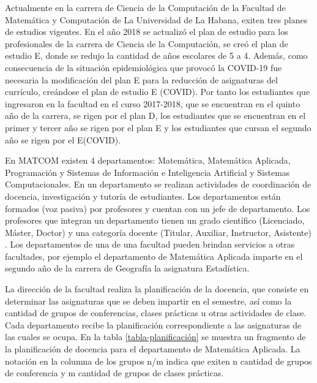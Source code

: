Actualmente en la carrera de Ciencia de la 
Computación de la Facultad de Matemática 
y Computación de La Universidad de La Habana, exiten tres planes de estudios 
vigentes. En el año 2018 se actualizó el plan de estudio para los profesionales de la 
carrera de Ciencia de la Computación, se creó el plan de estudio E,
donde se redujo la cantidad de años escolares de 5 a 4. Además, como consecuencia de la situación epidemiológica que provocó la COVID-19 
fue necesaria la modificación del plan E para la reducción de asignaturas del currículo, creándose 
el plan de estudio E (COVID). Por tanto los estudiantes que ingresaron en la facultad en 
el curso 2017-2018, que se encuentran en el quinto año de la carrera, se rigen por el plan D, 
los estudiantes que se encuentran en el primer y tercer año se rigen por el plan E y los 
estudiantes que cursan el segundo año se rigen por el E(COVID).   



En MATCOM existen 4 departamentos: Matemática, Matemática Aplicada,
Programación y Sistemas de Información e Inteligencia 
Artificial y Sistemas Computacionales.
En un departamento se realizan actividades de coordinación de docencia, investigación y 
tutoría de estudiantes. Los departamentos están formados (voz pasiva) por profesores
y cuentan con un jefe de departamento. Los profesores que integran un departamento tienen 
un grado científico (Licenciado, Máster, Doctor) y una categoría docente (Titular, Auxiliar, Instructor, Asistente) .
Los departamentos de una 
de una facultad pueden brindan servicios a otras facultades, por ejemplo el departamento de 
Matemática Aplicada imparte en el segundo año de la carrera de Geografía la asignatura 
Estadística.


La dirección de la facultad realiza la planificación de la docencia, que consiste 
en determinar las asignaturas que se deben impartir en el semestre,
así como la cantidad de grupos de conferencias, clases prácticas u otras 
actividades de clase. Cada departamento recibe la planificación 
correspondiente a las asignaturas de las cuales se ocupa.
En la tabla \ref{tabla-planificación} se muestra un fragmento 
de la planificación de docencia para el departamento de Matemática 
Aplicada. La notación en la columna de los grupos n/m indica que exiten n 
cantidad de grupos de conferencia y m cantidad de grupos de clases 
prácticas.


